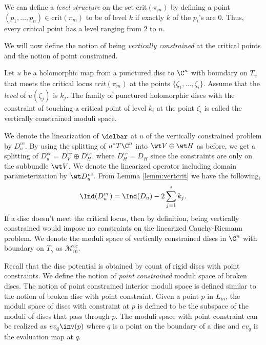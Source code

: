 \begin{defn}

We can define a \textit{level structure} on the set crit$(\pi_m)$ by defining a point $(p_1,\dots,p_n) \in \text{crit}(\pi_m)$ to be of level $k$ if exactly $k$ of the $p_i$'s are 0. Thus, every critical point has a level ranging from $2$ to $n$.
\end{defn}


We will now define the notion of being \textit{vertically constrained} at the critical points and the notion of point constrained.

\begin{defn}
Let $u$ be a holomorphic map from a punctured disc to $\C^n$ with boundary on $T_\gamma$ that meets the critical locus $crit(\pi_m)$ at the points $\{ \zeta_1 , \dots, \zeta_i \}$. Assume that the \textit{level} of $u(\zeta_j)$ is $k_j$. The family of punctured holomorphic discs with the constraint of touching a critical point of level $k_i$ at the point $\zeta_i$ is called the vertically constrained moduli space.
\end{defn} 
\noindent We denote the linearization of $\delbar$ at $u$ of the vertically constrained problem by $D_u^{vc}$. By using the splitting of $u^*T\C^n$ into $\wt V \oplus \wt H$ as before, we get a splitting of $D_u^{vc} = D_V^{vc} \oplus D_H^{vc}$, where $D_H^{vc} = D_H$ since the constraints are only on the subbundle $\wt V$. We denote the linearized operator including domain parameterization by $\wt D_u^{vc}$. From Lemma \ref{lemm:vertcrit} we have the following, $$\Ind (D^{vc}_u) = \Ind (D_u) - 2\sum_{j=1}^i{k_j}.$$ If a disc doesn't meet the critical locus, then by definition, being vertically constrained would impose no constraints on the linearized Cauchy-Riemann problem. We denote the moduli space of vertically constrained discs in $\C^n$ with boundary on $T_\gamma$ as $\mathcal{M}^{vc}_{in}$.  

Recall that the disc potential is obtained by count of rigid discs with point constraints. We define the notion of \textit{point constrained} moduli space of broken discs. The notion of point constrained interior moduli space is defined similar to the notion of broken disc with point constraint. Given a point $p$ in $L_{in}$, the moduli space of discs with constraint at $p$ is defined to be the subspace of the moduli of discs that pass through $p$.  The moduli space with point constraint can be realized as $ev_{q}\inv(p)$ where $q$ is a point on the boundary of a disc and $ev_q$ is the evaluation map at $q$. 



